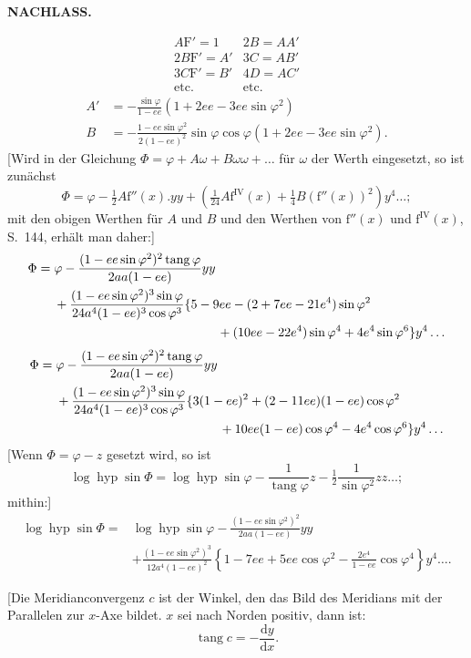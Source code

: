 \par\clearpage
{}\hfill{\small\textbf{NACHLASS.}}\hfill\null\par\medskip
{}
\[
\begin{array}{cc}
A\mathrm F'=1&2B=AA'\\2B\mathrm F'=A'&3C=AB'\\3C\mathrm F'=B'&4D=AC'\\\text{etc.}&\text{etc.}
\end{array}
\]
\[
\begin{aligned}
A'&=-\frac{\sin\varphi}{1-ee}(1+2ee-3ee\sin\varphi^2)\\
B&=-\frac{1-ee\sin\varphi^2}{2(1-ee)^2}\sin\varphi\cos\varphi(1+2ee-3ee\sin\varphi^2).
\end{aligned}
\]
[Wird in der Gleichung \(\Phi=\varphi+A\omega+B\omega\omega+\ldots\) für \(\omega\) der Werth eingesetzt, so ist zunächst
\[\Phi=\varphi-\tfrac12A\mathrm f''(x).yy+\left(\tfrac1{24}A\mathrm f^{\mathrm{IV}}(x)+\tfrac14B(\mathrm f''(x))^2\right)y^4\ldots;\]
\noindent mit den obigen Werthen für \(A\) und \(B\) und den Werthen von \(\mathrm f''(x)\) und \(\mathrm f^{\mathrm{IV}}(x)\), S.~144, erhält man daher:]
\[
\begin{aligned}
\Phi={}&\varphi-\frac{(1-ee\sin\varphi^2)^2\operatorname{tang}\varphi}{2aa(1-ee)}yy\\
&+\frac{(1-ee\sin\varphi^2)^3\sin\varphi}{24a^4(1-ee)^3\cos\varphi^3}\{5-9ee-(2+7ee-21e^4)\sin\varphi^2\\
&\hspace{45mm}+(10ee-22e^4)\sin\varphi^4+4e^4\sin\varphi^6\}y^4\ldots
\end{aligned}
\]
\noindent[oder]
\[
\begin{aligned}
\Phi={}&\varphi-\frac{(1-ee\sin\varphi^2)^2\operatorname{tang}\varphi}{2aa(1-ee)}yy\\
&+\frac{(1-ee\sin\varphi^2)^3\sin\varphi}{24a^4(1-ee)^3\cos\varphi^3}\{3(1-ee)^2+(2-11ee)(1-ee)\cos\varphi^2\\
&\hspace{45mm}+10ee(1-ee)\cos\varphi^4-4e^4\cos\varphi^6\}y^4\ldots
\end{aligned}
\]
[Wenn \(\Phi=\varphi-z\) gesetzt wird, so ist
\[\log\operatorname{hyp}\sin\Phi=\log\operatorname{hyp}\sin\varphi-\frac1{\operatorname{tang}\varphi}z-\tfrac12\frac1{\sin\varphi^2}zz\ldots;\]
\noindent mithin:]
\[
\begin{aligned}
\log\operatorname{hyp}\sin\Phi={}&\log\operatorname{hyp}\sin\varphi-\frac{(1-ee\sin\varphi^2)^2}{2aa(1-ee)}yy\\
&+\frac{(1-ee\sin\varphi^2)^3}{12a^4(1-ee)^2}\left\{1-7ee+5ee\cos\varphi^2-\frac{2e^4}{1-ee}\cos\varphi^4\right\}y^4\ldots.
\end{aligned}
\]
{\centering [2.]\par
[Berechnung der Meridianconvergenz aus den ebenen rechtwinkligen Coordinaten.]\par}
[Die Meridianconvergenz \(c\) ist der Winkel, den das Bild des Meridians mit der Parallelen zur \(x\)-Axe bildet. \(x\) sei nach Norden positiv, dann ist:
\[\operatorname{tang}c=-\frac{\mathrm dy}{\mathrm dx}.\]

